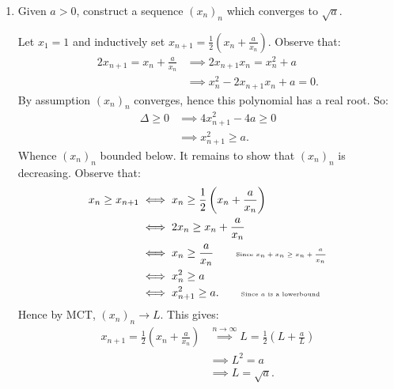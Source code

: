 \begin{enumerate}[label = (\arabic*)]
        \item Given $a > 0$, construct a sequence $(x_n)_n$ which converges to $\sqrt{a}$.
            {\color{red} \begin{solution}
                Let $x_1 = 1$ and inductively set $x_{n+1} = \frac{1}{2}\left(x_n + \frac{a}{x_n}\right)$. Observe that:
                    \begin{equation*}
                    \begin{split}
                        2x_{n+1} = x_n + \frac{a}{x_n}
                        & \implies 2x_{n+1}x_n = x_n^2 + a \\
                        & \implies x_n^2 - 2x_{n+1}x_n +a = 0.
                    \end{split}
                    \end{equation*}
                By assumption $(x_n)_n$ converges, hence this polynomial has a real root. So:
                    \begin{equation*}
                    \begin{split}
                        \Delta \geq 0 
                        &\implies  4x_{n+1}^2 - 4a \geq 0 \\
                        & \implies x_{n+1}^2 \geq a.
                    \end{split}
                    \end{equation*}
                Whence $(x_n)_n$ bounded below. It remains to show that $(x_n)_n$ is decreasing. Observe that:
                    \begin{equation*}
                    \begin{split}
                        x_n \geq x_{n+1}
                        & \iff x_n \geq \frac{1}{2}\left(x_n + \frac{a}{x_n}\right) \\
                        & \iff 2x_n \geq x_n + \frac{a}{x_n} \\
                        & \iff x_n \geq \frac{a}{x_n} \quad\quad \text{\tiny Since $x_n + x_n \geq x_n + \frac{a}{x_n}$}\\
                        & \iff x_n^2 \geq a \\
                        & \iff x_{n+1}^2 \geq a. \quad\quad \text{\tiny Since $a$ is a lowerbound}
                    \end{split}
                    \end{equation*}
                Hence by MCT, $(x_n)_n \rightarrow L$. This gives:
                    \begin{equation*}
                    \begin{split}
                        x_{n+1} = \frac{1}{2}\left(x_n + \frac{a}{x_n}\right)
                        & \stackrel{n \rightarrow \infty}{\implies} L = \frac{1}{2}\left(L + \frac{a}{L}\right) \\
                        & \implies L^2 = a \\
                        & \implies L = \sqrt{a}.
                    \end{split}
                    \end{equation*}
            \end{solution}}


\end{enumerate}
